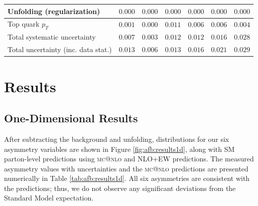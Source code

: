 \begin{table}[!h]
\begin{center}
\begin{tabular}{l||r|r|r|r|r|r}
Unfolding (regularization)        & $0.000$   & $0.000$   & $0.000$   & $0.000$   & $0.000$   & $0.000$   \\
\hline
\hline
Top quark $p_T$                   & $0.001$   & $0.000$   & $0.011$   & $0.006$   & $0.006$   & $0.004$   \\
\hline
\hline
Total systematic uncertainty      & $0.007$   & $0.003$   & $0.012$   & $0.012$   & $0.016$   & $0.028$   \\
\hline
\hline
Total uncertainty (inc. data stat.) & $0.013$   & $0.006$   & $0.013$   & $0.016$   & $0.021$   & $0.029$   \\
\hline
\end{tabular}
\end{center}
\end{table}

\section{Results}
\label{sec:afb:results}

\subsection{One-Dimensional Results}
\label{ssec:afb:results1d}

After subtracting the background and unfolding, distributions for our
six asymmetry variables are shown in Figure \ref{fig:afb:results1d},
along with SM parton-level predictions using
\textsc{mc@nlo} and NLO+EW predictions. The
measured asymmetry values with uncertainties and the \textsc{mc@nlo}
predictions are presented numerically in Table
\ref{tab:afb:results1d}. All six asymmetries are consistent with the
predictions; thus, we do not observe any significant deviations from
the Standard Model expectation.

